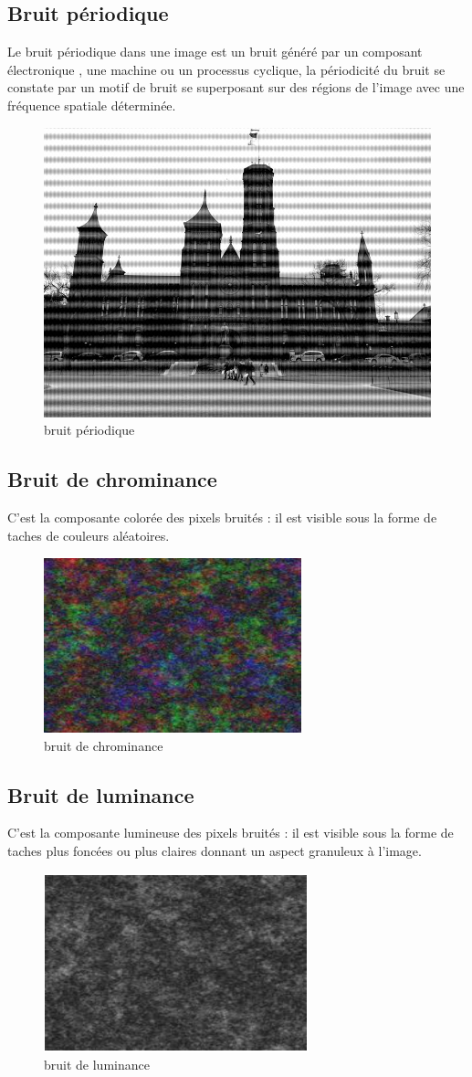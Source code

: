 \documentclass[12pt,a4paper]{report}
\numberwithin{equation}{subsection}
\numberwithin{equation}{section}
\begin{document}
\subsection{Bruit périodique}
Le bruit périodique dans une image est un bruit généré par un composant électronique , une machine ou un processus cyclique, la périodicité du bruit se constate par un motif de bruit se superposant sur des régions de l’image avec une fréquence spatiale déterminée.\\
\begin{figure}[h!]
    \centering
    \includegraphics[width=.3\textwidth]{periodique.jpg}
     \caption{bruit périodique}
\end{figure}
\subsection{Bruit de chrominance}
C’est la composante colorée des pixels bruités : il est visible sous la forme de taches de
couleurs aléatoires.\\
\begin{figure}[h!]
    \centering
    \includegraphics[width=.3\textwidth]{ch.PNG}
     \caption{bruit de chrominance}
\end{figure}
\newline
\subsection{Bruit de luminance}
C’est la composante lumineuse des pixels bruités : il est visible sous la forme de taches
plus foncées ou plus claires donnant un aspect granuleux à l'image.
\begin{figure}[h!]
    \centering
    \includegraphics[width=.3\textwidth]{lu.PNG}
     \caption{bruit de luminance}
\end{figure}
\end{document}
